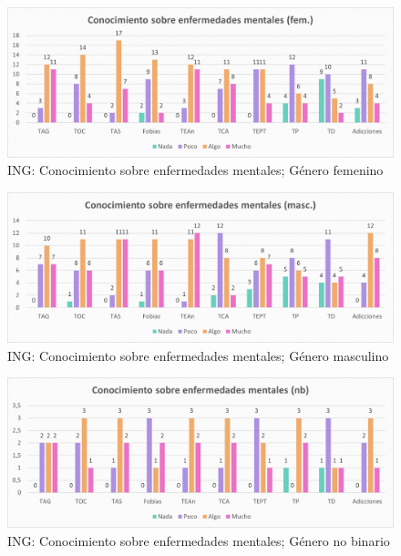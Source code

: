\documentclass[12pt, a4paper,twoside,titlepage]{book}
\begin{document}
\begin{figure}
    \centering
    \includegraphics[width=1\linewidth]{ANEXO ING/9ANexINGConfem}
    \caption{ING: Conocimiento sobre enfermedades mentales; Género femenino}
    \label{fig:INGConfem}
\end{figure}

\begin{figure}
    \centering
    \includegraphics[width=1\linewidth]{ANEXO ING/10AnexINGConmasc}
    \caption{ING: Conocimiento sobre enfermedades mentales; Género masculino}
    \label{fig:INGConmasc}
\end{figure}
\begin{figure}
    \centering
    \includegraphics[width=1\linewidth]{ANEXO ING/11AnexINGConnb}
    \caption{ING: Conocimiento sobre enfermedades mentales; Género no binario}
    \label{fig:INGConnb}
\end{figure}
\end{document}
